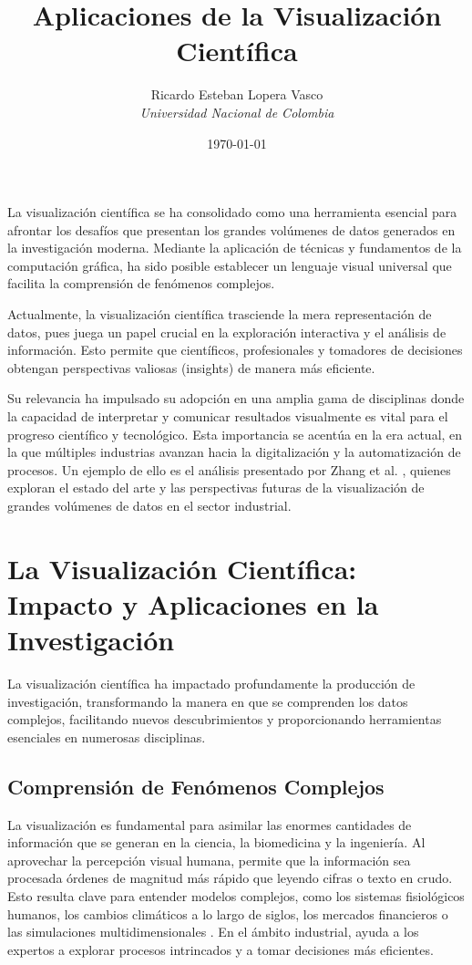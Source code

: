 \documentclass[12pt,a4paper]{article}
\title{\textbf{Aplicaciones de la Visualización Científica}}
\author{Ricardo Esteban Lopera Vasco \\
\textit{Universidad Nacional de Colombia}}
\date{\today}
\begin{document}
\maketitle


La visualización científica se ha consolidado como una herramienta esencial para afrontar los desafíos que presentan los grandes volúmenes de datos generados en la investigación moderna. Mediante la aplicación de técnicas y fundamentos de la computación gráfica, ha sido posible establecer un lenguaje visual universal que facilita la comprensión de fenómenos complejos.

Actualmente, la visualización científica trasciende la mera representación de datos, pues juega un papel crucial en la exploración interactiva y el análisis de información. Esto permite que científicos, profesionales y tomadores de decisiones obtengan perspectivas valiosas (insights) de manera más eficiente.

Su relevancia ha impulsado su adopción en una amplia gama de disciplinas donde la capacidad de interpretar y comunicar resultados visualmente es vital para el progreso científico y tecnológico. Esta importancia se acentúa en la era actual, en la que múltiples industrias avanzan hacia la digitalización y la automatización de procesos. Un ejemplo de ello es el análisis presentado por Zhang et al. \cite{ZHANG2025}, quienes exploran el estado del arte y las perspectivas futuras de la visualización de grandes volúmenes de datos en el sector industrial.


\section*{La Visualización Científica: Impacto y Aplicaciones en la Investigación}

La visualización científica ha impactado profundamente la producción de investigación, transformando la manera en que se comprenden los datos complejos, facilitando nuevos descubrimientos y proporcionando herramientas esenciales en numerosas disciplinas.

\subsection*{Comprensión de Fenómenos Complejos}
La visualización es fundamental para asimilar las enormes cantidades de información que se generan en la ciencia, la biomedicina y la ingeniería. Al aprovechar la percepción visual humana, permite que la información sea procesada órdenes de magnitud más rápido que leyendo cifras o texto en crudo. Esto resulta clave para entender modelos complejos, como los sistemas fisiológicos humanos, los cambios climáticos a lo largo de siglos, los mercados financieros o las simulaciones multidimensionales \cite{Moorhead2006}. En el ámbito industrial, ayuda a los expertos a explorar procesos intrincados y a tomar decisiones más eficientes.
\end{document}
